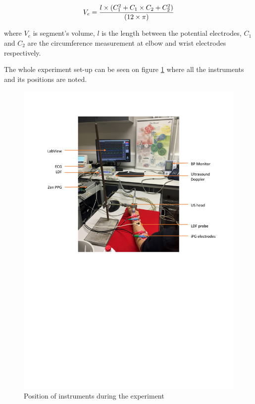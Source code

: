 \begin{align}
	\label{eq:v_e}
	V_e =\frac{l \times (C_1^2+C_1 \times C_2 + C_2^2)}{(12 \times \pi)} \tagaddtext{[\si{\cubic\centi\meter}]}
\end{align}

where $V_e$ is segment's volume, $l$ is the length between the potential electrodes, $C_1$ and $C_2$ are the circumference measurement at elbow and wrist electrodes respectively.

The whole experiment set-up can be seen on figure \ref{fig:experimental set-up} where all the instruments and its positions are noted.

\begin{figure}[!htpb]
	\centering
	\includegraphics[width=15cm,keepaspectratio]{figure1}
	\caption{Position of instruments during the experiment}
	\label{fig:experimental set-up}
\end{figure}

